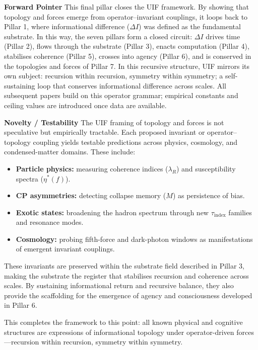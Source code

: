 \noindent \textbf {Forward Pointer}
\newline \noindent This final pillar closes the UIF framework. By showing that topology and forces emerge from operator–invariant couplings, it loops back to Pillar 1, where informational difference ($\Delta I$) was defined as the fundamental substrate. In this way, the seven pillars form a closed circuit: $\Delta I$ drives time (Pillar 2), flows through the substrate (Pillar 3), enacts computation (Pillar 4), stabilises coherence (Pillar 5), crosses into agency (Pillar 6), and is conserved in the topologies and forces of Pillar 7. In this recursive structure, UIF mirrors its own subject: recursion within recursion, symmetry within symmetry; a self-sustaining loop that conserves informational difference across scales. All subsequent papers build on this operator grammar; empirical constants and ceiling values are introduced once data are available.
\newline

\noindent
\noindent\textbf{Novelty / Testability}
\newline
The UIF framing of topology and forces is not speculative but empirically tractable.
Each proposed invariant or operator–topology coupling yields testable predictions across
physics, cosmology, and condensed-matter domains.  These include:
\begin{itemize}[leftmargin=*,itemsep=0pt,parsep=0pt,topsep=3pt]
    \item \textbf{Particle physics:} measuring coherence indices ($\lambda_R$) and
          susceptibility spectra ($\eta^{\ast}(f)$).
    \item \textbf{CP asymmetries:} detecting collapse memory ($M$) as persistence of bias.
    \item \textbf{Exotic states:} broadening the hadron spectrum through new
          $\tau_{\text{index}}$ families and resonance modes.
    \item \textbf{Cosmology:} probing fifth-force and dark-photon windows as manifestations
          of emergent invariant couplings.
\end{itemize}
\noindent
These invariants are preserved within the substrate field described in Pillar 3,
making the substrate the register that stabilises recursion and coherence across scales.
By sustaining informational return and recursive balance, they also provide the scaffolding
for the emergence of agency and consciousness developed in Pillar 6.

\noindent
This completes the framework to this point: all known physical and cognitive structures
are expressions of informational topology under operator-driven forces—recursion within
recursion, symmetry within symmetry.

